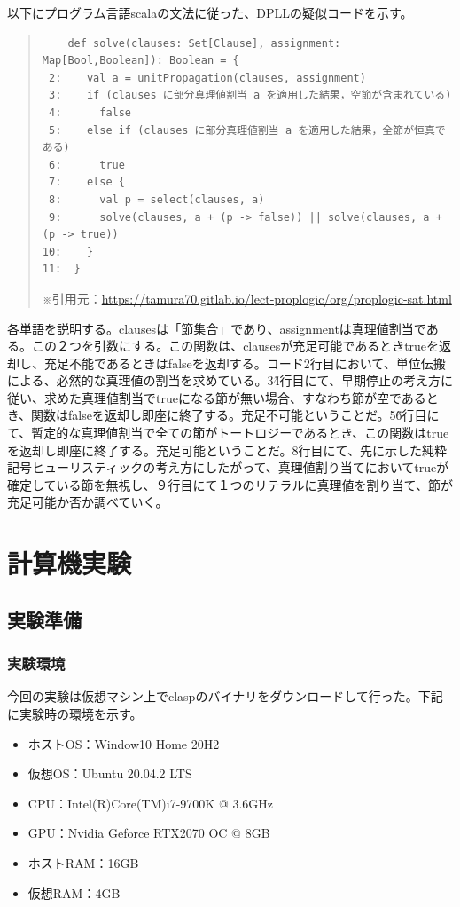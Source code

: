 \documentclass[dvipdfmx]{jsarticle}
\begin{document}
以下にプログラム言語scalaの文法に従った、DPLLの疑似コードを示す。
\begin{quote}
  \begin{verbatim}
    def solve(clauses: Set[Clause], assignment: Map[Bool,Boolean]): Boolean = {
 2:    val a = unitPropagation(clauses, assignment)
 3:    if (clauses に部分真理値割当 a を適用した結果，空節が含まれている)
 4:      false
 5:    else if (clauses に部分真理値割当 a を適用した結果，全節が恒真である)
 6:      true
 7:    else {
 8:      val p = select(clauses, a)
 9:      solve(clauses, a + (p -> false)) || solve(clauses, a + (p -> true))
10:    }
11:  }
  \end{verbatim}
  ※引用元：\url{https://tamura70.gitlab.io/lect-proplogic/org/proplogic-sat.html}
\end{quote}
各単語を説明する。clausesは「節集合」であり、assignmentは真理値割当である。この２つを引数にする。この関数は、clausesが充足可能であるときtrueを返却し、充足不能であるときはfalseを返却する。コード2行目において、単位伝搬による、必然的な真理値の割当を求めている。3\~4行目にて、早期停止の考え方に従い、求めた真理値割当でtrueになる節が無い場合、すなわち節が空であるとき、関数はfalseを返却し即座に終了する。充足不可能ということだ。5\~6行目にて、暫定的な真理値割当で全ての節がトートロジーであるとき、この関数はtrueを返却し即座に終了する。充足可能ということだ。8行目にて、先に示した純粋記号ヒューリスティックの考え方にしたがって、真理値割り当てにおいてtrueが確定している節を無視し、９行目にて１つのリテラルに真理値を割り当て、節が充足可能か否か調べていく。\par
\section{計算機実験}
\subsection{実験準備}
  \subsubsection{実験環境}
  今回の実験は仮想マシン上でclaspのバイナリをダウンロードして行った。下記に実験時の環境を示す。
  \begin{itemize}
    \item ホストOS：Window10 Home 20H2
    \item 仮想OS：Ubuntu 20.04.2 LTS
    \item CPU：Intel(R)Core(TM)i7-9700K @ 3.6GHz
    \item GPU：Nvidia Geforce RTX2070 OC @ 8GB
    \item ホストRAM：16GB
    \item 仮想RAM：4GB
  \end{itemize}
\end{document}
